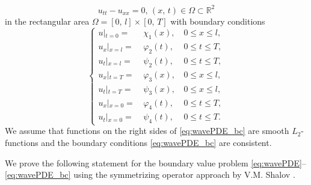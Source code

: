 \documentclass[12pt]{llncs}
\begin{document}
\begin{equation}
u_{tt}-u_{xx}=0,\,\left(x,\,t\right)\in\Omega\subset\mathbb{R}^{2}
\label{eq:wavePDE}
\end{equation}
in the rectangular area $\Omega=\left[0,\,l\right]\times\left[0,\,T\right]$ with boundary conditions
\begin{equation}
\left\{ \begin{array}{lll}
u\left|_{t=0}\right.=\, & \chi_{1}\left(x\right),\, & 0\leq x\leq l, \\
u_{x}\left|_{x=l}\right.=\, & \varphi_{2}\left(t\right),\, & 0\leq t\leq T,\\
u_{t}\left|_{x=l}\right.=\, & \psi_{2}\left(t\right),\, & 0\leq t\leq T,\\
u_{x}\left|_{t=T}\right.=\, & \varphi_{3}\left(x\right),\, & 0\leq x\leq l, \\
u_{t}\left|_{t=T}\right.=\, & \psi_{3}\left(x\right),\, & 0\leq x\leq l, \\
u_{x}\left|_{x=0}\right.=\, & \varphi_{4}\left(t\right),\, & 0\leq t\leq T,\\
u_{t}\left|_{x=0}\right.=\, & \psi_{4}\left(t\right),\, & 0\leq t\leq T.
\end{array}
\right.
\label{eq:wavePDE_bc}
\end{equation}
We assume that functions on the right sides of \eqref{eq:wavePDE_bc} are smooth $L_{2}$-functions and the boundary conditions \eqref{eq:wavePDE_bc} are consistent.

We prove the following statement  for the boundary value problem \eqref{eq:wavePDE}--\eqref{eq:wavePDE_bc} using the symmetrizing operator approach by V.M. Shalov \cite{Shalov1965}.
\end{document}
